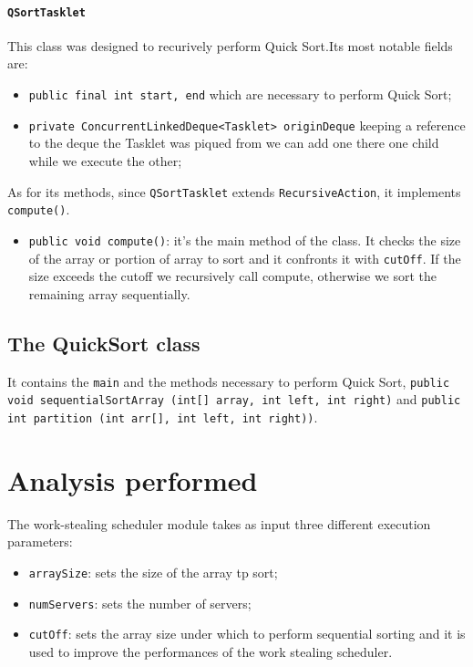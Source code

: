 \documentclass{article}
\def\code#1{\texttt{#1}}
\begin{document}
	\paragraph{\code{QSortTasklet}} This class was designed to recurively perform Quick Sort.Its most notable fields are:
	\begin{itemize}
		\item \code{public final int start, end} which are necessary to perform Quick Sort; 
		\item \code{private ConcurrentLinkedDeque<Tasklet> originDeque} keeping a reference to the deque the Tasklet was piqued from we can add one there one child while we execute the other;
	\end{itemize}
	
	As for its methods, since \code{QSortTasklet} extends \code{RecursiveAction}, it implements \code{compute()}.
	\begin{itemize}
		\item \code{public void compute()}: it's the main method of the class. It checks the size of the array or portion of array to sort and it confronts it with \code{cutOff}. If the size exceeds the cutoff we recursively call compute, otherwise we sort the remaining array sequentially. 
	\end{itemize}
	
	\subsection{The QuickSort class}
	It contains the \code{main} and the methods necessary to perform Quick Sort, \code{public void sequentialSortArray (int[] array, int left, int right)} and \code{public int partition (int arr[], int left, int right))}.
	
	\section{Analysis performed}\label{analysis}
	The work-stealing scheduler module takes as input three different execution parameters: 
	\begin{itemize}
		\item \code{arraySize}: sets the size of the array tp sort;
		\item \code{numServers}: sets the number of servers;
		\item \code{cutOff}: sets the array size under which to perform sequential sorting and it is used to improve the performances of the work stealing scheduler.
	\end{itemize}
		
\end{document}
